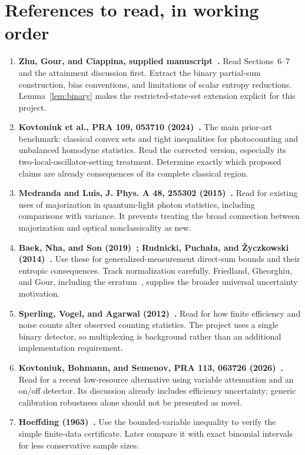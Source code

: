 \documentclass[11pt,a4paper]{article}
\begin{document}
\section{References to read, in working order}
\begin{enumerate}[leftmargin=*,label=\textbf{\arabic*.}]
\item \textbf{Zhu, Gour, and Ciappina, supplied manuscript~\cite{ZhuManuscript}.}
Read Sections~6--7 and the attainment discussion first. Extract the binary
partial-sum construction, bias conventions, and limitations of scalar entropy
reductions. Lemma~\ref{lem:binary} makes the restricted-state-set extension
explicit for this project.
\item \textbf{Kovtoniuk et al., PRA 109, 053710 (2024)~\cite{Kovtoniuk2024}.}
The main prior-art benchmark: classical convex sets and tight inequalities for
photocounting and unbalanced homodyne statistics. Read the corrected version,
especially its two-local-oscillator-setting treatment. Determine exactly which
proposed claims are already consequences of its complete classical region.
\item \textbf{Medranda and Luis, J. Phys. A 48, 255302 (2015)~\cite{Medranda2015}.}
Read for existing uses of majorization in quantum-light photon statistics,
including comparisons with variance. It prevents treating the broad connection
between majorization and optical nonclassicality as new.
\item \textbf{Baek, Nha, and Son (2019)~\cite{Baek2019};
Rudnicki, Pucha\l a, and \.{Z}yczkowski (2014)~\cite{Rudnicki2014}.}
Use these for generalized-measurement direct-sum bounds and their entropic
consequences. Track normalization carefully. Friedland, Gheorghiu, and Gour,
including the erratum~\cite{Friedland2013}, supplies the broader universal
uncertainty motivation.
\item \textbf{Sperling, Vogel, and Agarwal (2012)~\cite{Sperling2012}.}
Read for how finite efficiency and noise counts alter observed counting
statistics. The project uses a single binary detector, so multiplexing is
background rather than an additional implementation requirement.
\item \textbf{Kovtoniuk, Bohmann, and Semenov, PRA 113, 063726 (2026)~\cite{Kovtoniuk2026}.}
Read for a recent low-resource alternative using variable attenuation and an
on/off detector. Its discussion already includes efficiency uncertainty;
generic calibration robustness alone should not be presented as novel.
\item \textbf{Hoeffding (1963)~\cite{Hoeffding1963}.}
Use the bounded-variable inequality to verify the simple finite-data certificate.
Later compare it with exact binomial intervals for less conservative sample sizes.
\end{enumerate}
\end{document}
